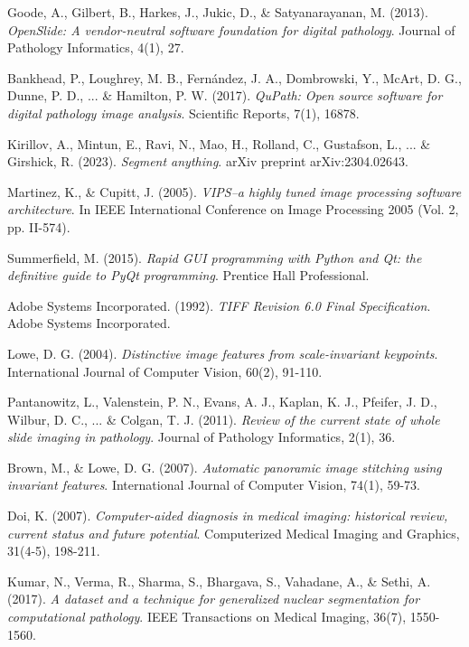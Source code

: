 \documentclass[12pt,a4paper]{report}
\begin{document}
\begin{thebibliography}{20}

Goode, A., Gilbert, B., Harkes, J., Jukic, D., \& Satyanarayanan, M. (2013). 
\textit{OpenSlide: A vendor-neutral software foundation for digital pathology}. 
Journal of Pathology Informatics, 4(1), 27.

Bankhead, P., Loughrey, M. B., Fernández, J. A., Dombrowski, Y., McArt, D. G., Dunne, P. D., ... \& Hamilton, P. W. (2017). 
\textit{QuPath: Open source software for digital pathology image analysis}. 
Scientific Reports, 7(1), 16878.

Kirillov, A., Mintun, E., Ravi, N., Mao, H., Rolland, C., Gustafson, L., ... \& Girshick, R. (2023). 
\textit{Segment anything}. 
arXiv preprint arXiv:2304.02643.

Martinez, K., \& Cupitt, J. (2005). 
\textit{VIPS–a highly tuned image processing software architecture}. 
In IEEE International Conference on Image Processing 2005 (Vol. 2, pp. II-574).

Summerfield, M. (2015). 
\textit{Rapid GUI programming with Python and Qt: the definitive guide to PyQt programming}. 
Prentice Hall Professional.

Adobe Systems Incorporated. (1992). 
\textit{TIFF Revision 6.0 Final Specification}. 
Adobe Systems Incorporated.

Lowe, D. G. (2004). 
\textit{Distinctive image features from scale-invariant keypoints}. 
International Journal of Computer Vision, 60(2), 91-110.

Pantanowitz, L., Valenstein, P. N., Evans, A. J., Kaplan, K. J., Pfeifer, J. D., Wilbur, D. C., ... \& Colgan, T. J. (2011). 
\textit{Review of the current state of whole slide imaging in pathology}. 
Journal of Pathology Informatics, 2(1), 36.

Brown, M., \& Lowe, D. G. (2007). 
\textit{Automatic panoramic image stitching using invariant features}. 
International Journal of Computer Vision, 74(1), 59-73.

Doi, K. (2007). 
\textit{Computer-aided diagnosis in medical imaging: historical review, current status and future potential}. 
Computerized Medical Imaging and Graphics, 31(4-5), 198-211.

Kumar, N., Verma, R., Sharma, S., Bhargava, S., Vahadane, A., \& Sethi, A. (2017). 
\textit{A dataset and a technique for generalized nuclear segmentation for computational pathology}. 
IEEE Transactions on Medical Imaging, 36(7), 1550-1560.


\end{thebibliography}
\end{document}
